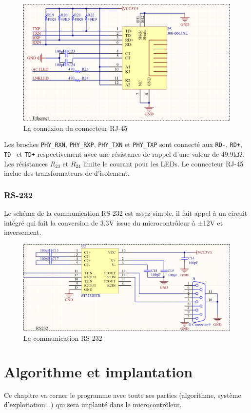 \documentclass[11pt, a4paper, twoside]{book}
\begin{document}
{\begin{figure}[h]
\centering
\includegraphics[width=\textwidth]{ethernet}
\caption{La connexion du connecteur RJ-45}
\end{figure}
Les broches \texttt{PHY\_RXN}, \texttt{PHY\_RXP}, \texttt{PHY\_TXN} et \texttt{PHY\_TXP} sont connecté aux \texttt{RD-}, \texttt{RD+}, \texttt{TD-} et \texttt{TD+} respectivement avec une résistance de rappel d'une valeur de 49.9k$\Omega$.
Les résistances $R_{23}$ et $R_{24}$ limite le courant pour les LEDs. Le connecteur RJ-45 inclue des transformateurs de d'isolement.
\label{sec:ethernet}
\subsection{RS-232}
Le schéma de la communication RS-232 est assez simple, il fait appel à un circuit intégré qui fait la conversion de 3.3V issue du microcontrôleur à $\pm$12V et inversement.
\begin{figure}[h]
\centering
\includegraphics[width=\textwidth]{rs232}
\caption{La communication RS-232}
\end{figure}

\chapter{Algorithme et implantation}
Ce chapitre va cerner le programme avec toute ses parties (algorithme, système d'exploitation...) qui sera implanté dans le microcontrôleur.
}
\end{document}
